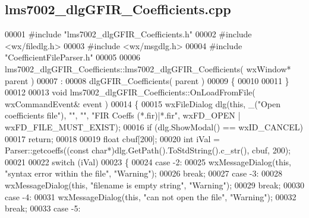\subsection{lms7002\+\_\+dlg\+G\+F\+I\+R\+\_\+\+Coefficients.\+cpp}
\label{lms7002__dlgGFIR__Coefficients_8cpp_source}

\begin{DoxyCode}
00001 \textcolor{preprocessor}{#include "lms7002_dlgGFIR_Coefficients.h"}
00002 \textcolor{preprocessor}{#include <wx/filedlg.h>}
00003 \textcolor{preprocessor}{#include <wx/msgdlg.h>}
00004 \textcolor{preprocessor}{#include "CoefficientFileParser.h"}
00005 
00006 lms7002_dlgGFIR_Coefficients::lms7002_dlgGFIR_Coefficients( wxWindow* parent )
00007 :
00008 dlgGFIR_Coefficients( parent )
00009 \{
00010 
00011 \}
00012 
00013 \textcolor{keywordtype}{void} lms7002_dlgGFIR_Coefficients::OnLoadFromFile( wxCommandEvent& event )
00014 \{
00015     wxFileDialog dlg(\textcolor{keyword}{this}, \_(\textcolor{stringliteral}{"Open coefficients file"}), \textcolor{stringliteral}{""}, \textcolor{stringliteral}{""}, \textcolor{stringliteral}{"FIR Coeffs (*.fir)|*.fir"}, wxFD\_OPEN | 
      wxFD\_FILE\_MUST\_EXIST);
00016     \textcolor{keywordflow}{if} (dlg.ShowModal() == wxID\_CANCEL)
00017         \textcolor{keywordflow}{return};
00018 
00019     \textcolor{keywordtype}{float} cbuf[200];
00020     \textcolor{keywordtype}{int} iVal = Parser::getcoeffs((\textcolor{keyword}{const} \textcolor{keywordtype}{char}*)dlg.GetPath().ToStdString().c\_str(), cbuf, 200);
00021 
00022     \textcolor{keywordflow}{switch} (iVal)
00023     \{
00024     \textcolor{keywordflow}{case} -2:
00025         wxMessageDialog(\textcolor{keyword}{this}, \textcolor{stringliteral}{"syntax error within the file"}, \textcolor{stringliteral}{"Warning"});
00026         \textcolor{keywordflow}{break};
00027     \textcolor{keywordflow}{case} -3:
00028         wxMessageDialog(\textcolor{keyword}{this}, \textcolor{stringliteral}{"filename is empty string"}, \textcolor{stringliteral}{"Warning"});
00029         \textcolor{keywordflow}{break};
00030     \textcolor{keywordflow}{case} -4:
00031         wxMessageDialog(\textcolor{keyword}{this}, \textcolor{stringliteral}{"can not open the file"}, \textcolor{stringliteral}{"Warning"});
00032         \textcolor{keywordflow}{break};
00033     \textcolor{keywordflow}{case} -5:

\end{DoxyCode}
